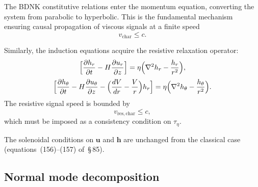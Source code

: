 The BDNK constitutive relations enter the
momentum equation, converting the system from parabolic to hyperbolic.
This is the fundamental mechanism ensuring causal propagation of viscous
signals at a finite speed
\begin{equation}
  v_{\mathrm{char}} \leqslant c.
  \label{eq:rel-9-vvisc}
\end{equation}

Similarly, the induction equations acquire the resistive relaxation
operator:
\begin{equation}
  
  \Bigl[\frac{\partial h_r}{\partial t}
    - H\frac{\partial u_r}{\partial z}\Bigr]
  = \eta\Bigl(\nabla^2 h_r - \frac{h_r}{r^2}\Bigr),
  \label{eq:rel-9-152R}
\end{equation}
\begin{equation}
  
  \Bigl[\frac{\partial h_\theta}{\partial t}
    - H\frac{\partial u_\theta}{\partial z}
    - \Bigl(\frac{dV}{dr}-\frac{V}{r}\Bigr)h_r\Bigr]
  = \eta\Bigl(\nabla^2 h_\theta - \frac{h_\theta}{r^2}\Bigr).
  \label{eq:rel-9-153R}
\end{equation}
The resistive signal speed is bounded by
\begin{equation}
  v_{\mathrm{res,char}} \leqslant c,
  \label{eq:rel-9-vres}
\end{equation}
which must be imposed as a consistency condition on $\tau_\eta$.

The solenoidal conditions on $\mathbf{u}$ and $\mathbf{h}$ are unchanged
from the classical case (equations~(156)--(157) of~\S\,85).

\subsection{Normal mode decomposition}
\label{sec:rel-87-modes}

